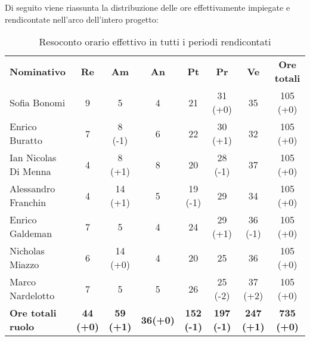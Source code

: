 \documentclass[../piano-di-progetto.tex]{subfiles}
\begin{document}
  Di seguito viene riassunta la distribuzione delle ore effettivamente impiegate e rendicontate nell'arco dell'intero progetto:
  \begin{table}[H]
    \centering
    \begin{tabular}{lccccccc}
      \rowcolor{lightgray}
      \textbf{Nominativo}       & \textbf{Re}      & \textbf{Am} & \textbf{An}      & \textbf{Pt} & \textbf{Pr} & \textbf{Ve} & \textbf{Ore totali} \\
Sofia Bonomi              & 9                & 5                & 4               & 21                & 31 (+0)           & 35                & 105 (+0)          \\
Enrico Buratto            & 7                & 8 (-1)           & 6               & 22                & 30 (+1)           & 32                & 105 (+0)          \\
Ian Nicolas Di Menna      & 4                & 8 (+1)           & 8               & 20                & 28 (-1)           & 37                & 105 (+0)          \\
Alessandro Franchin       & 4                & 14 (+1)          & 5               & 19 (-1)           & 29                & 34                & 105 (+0)          \\
Enrico Galdeman           & 7                & 5                & 4               & 24                & 29 (+1)           & 36 (-1)           & 105 (+0)          \\
Nicholas Miazzo           & 6                & 14 (+0)          & 4               & 20                & 25                & 36                & 105 (+0)          \\
Marco Nardelotto          & 7                & 5                & 5               & 26                & 25 (-2)           & 37 (+2)           & 105 (+0)          \\
\textbf{Ore totali ruolo} & \textbf{44 (+0)} & \textbf{59 (+1)} & \textbf{36(+0)} & \textbf{152 (-1)} & \textbf{197 (-1)} & \textbf{247 (+1)} & \textbf{735 (+0)}
    \end{tabular}
    \caption{Resoconto orario effettivo in tutti i periodi rendicontati}
  \end{table}
  
\end{document}
